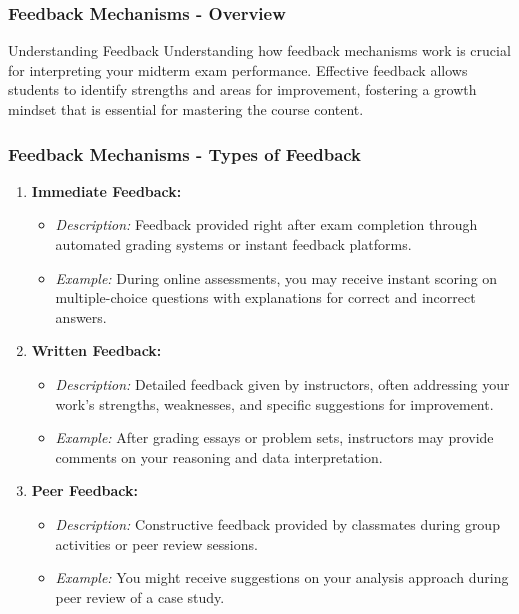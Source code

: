 \documentclass[aspectratio=169]{beamer}
\begin{document}
\begin{frame}[fragile]
    \frametitle{Feedback Mechanisms - Overview}
    \begin{block}{Understanding Feedback}
        Understanding how feedback mechanisms work is crucial for interpreting your midterm exam performance. 
        Effective feedback allows students to identify strengths and areas for improvement, fostering a growth mindset that is essential for mastering the course content. 
    \end{block}
\end{frame}

\begin{frame}[fragile]
    \frametitle{Feedback Mechanisms - Types of Feedback}
    \begin{enumerate}
        \item \textbf{Immediate Feedback:}
        \begin{itemize}
            \item \textit{Description:} Feedback provided right after exam completion through automated grading systems or instant feedback platforms.
            \item \textit{Example:} During online assessments, you may receive instant scoring on multiple-choice questions with explanations for correct and incorrect answers.
        \end{itemize}
        
        \item \textbf{Written Feedback:}
        \begin{itemize}
            \item \textit{Description:} Detailed feedback given by instructors, often addressing your work's strengths, weaknesses, and specific suggestions for improvement.
            \item \textit{Example:} After grading essays or problem sets, instructors may provide comments on your reasoning and data interpretation.
        \end{itemize}
        
        \item \textbf{Peer Feedback:}
        \begin{itemize}
            \item \textit{Description:} Constructive feedback provided by classmates during group activities or peer review sessions.
            \item \textit{Example:} You might receive suggestions on your analysis approach during peer review of a case study.
        \end{itemize}
    \end{enumerate}
\end{frame}
\end{document}

